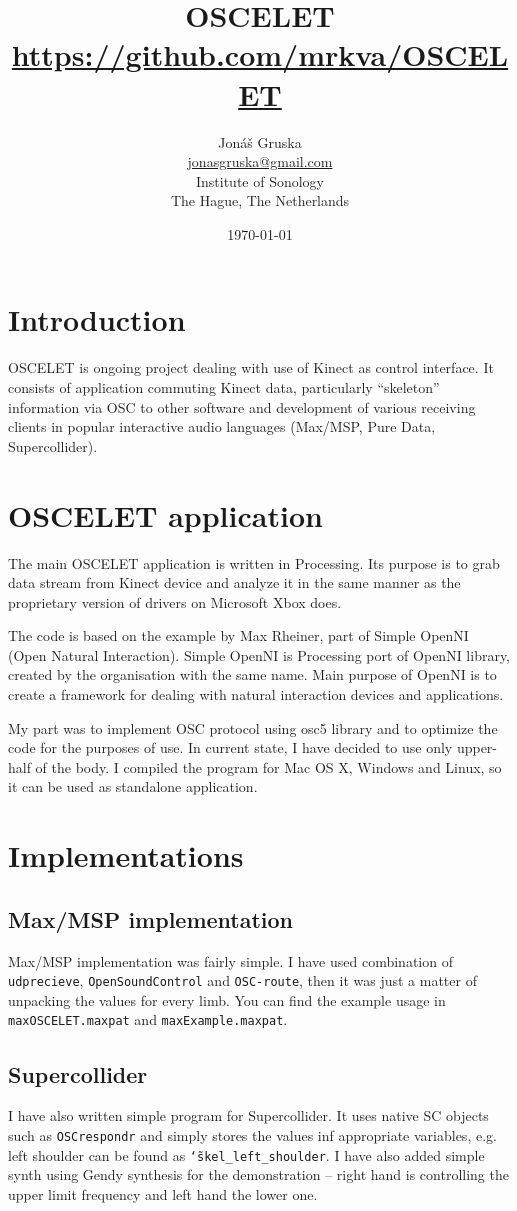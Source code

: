 \documentclass[11pt,a4paper,oneside]{article}
\title{OSCELET\\
			\small{\url{https://github.com/mrkva/OSCELET}}}
\author{Jonáš Gruska \\
	\url{jonasgruska@gmail.com} \\
	Institute of Sonology \\
	The Hague, The Netherlands}
\date{\today}
\begin{document}
\maketitle

\section{Introduction}
OSCELET is ongoing project dealing with use of Kinect as control interface. It consists of application commuting Kinect data, particularly ``skeleton'' information via OSC to other software and development of various receiving clients in popular interactive audio languages (Max/MSP, Pure Data, Supercollider).

\section{OSCELET application}
The main OSCELET application is written in Processing. Its purpose is to grab data stream from Kinect device and analyze it in the same manner as the proprietary version of drivers on Microsoft Xbox does.

The code is based on the example by Max Rheiner, part of Simple OpenNI (Open Natural Interaction). Simple OpenNI is Processing port of OpenNI library, created by the organisation with the same name. Main purpose of OpenNI is to create a framework for dealing with natural interaction devices and applications.

My part was to implement OSC protocol using osc5 library and to optimize the code for the purposes of use. In current state, I have decided to use only upper-half of the body. I compiled the program for Mac OS X, Windows and Linux, so it can be used as standalone application.

\section{Implementations}
\subsection{Max/MSP implementation}
Max/MSP implementation was fairly simple. I have used combination of \texttt{udprecieve},  \texttt{OpenSoundControl} and \texttt{OSC-route}, then it was just a matter of unpacking the values for every limb. You can find the example usage in \texttt{maxOSCELET.maxpat} and \texttt{maxExample.maxpat}. 

\subsection{Supercollider}
I have also written simple program for Supercollider. It uses native SC objects such as \texttt{OSCrespondr} and simply stores the values inf appropriate variables, e.g. left shoulder can be found as \texttt{\char`\~skel\_left\_shoulder}. I have also added simple synth using Gendy synthesis for the demonstration -- right hand is controlling the upper limit frequency and left hand the lower one.
\end{document}
